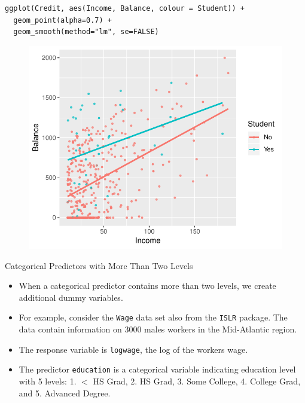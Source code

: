 \documentclass[10pt]{beamer}\usepackage[]{graphicx}\usepackage[]{color}
\begin{document}
\begin{frame}[fragile]
\small
\begin{verbatim}
ggplot(Credit, aes(Income, Balance, colour = Student)) +
  geom_point(alpha=0.7) +
  geom_smooth(method="lm", se=FALSE)
\end{verbatim}
\begin{figure}
\includegraphics[scale=0.6]{figure/balance_unrelated.pdf}
\end{figure}
\end{frame}

\begin{frame}{Categorical Predictors with More Than Two Levels}
\begin{itemize}
\item When a categorical predictor contains more than two levels, we create additional dummy variables.\\
\vspace{5pt}
\item For example, consider the \texttt{Wage} data set also from the \texttt{ISLR} package.  The data contain information on 3000 males workers in the Mid-Atlantic region.\\
\vspace{5pt}
\item The response variable is \texttt{logwage}, the log of the workers wage.\\
\vspace{5pt}
\item The predictor \texttt{education} is a categorical variable indicating education level with 5 levels: 1. $<$ HS Grad, 2. HS Grad, 3. Some College, 4. College Grad, and 5. Advanced Degree.
\end{itemize}
\end{frame}
\end{document}
